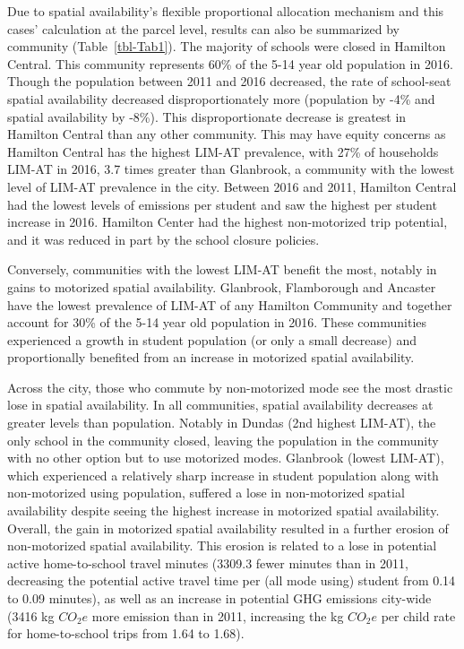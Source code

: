 \documentclass[
default
]{sn-jnl}
\begin{document}
Due to spatial availability's flexible proportional allocation mechanism
and this cases' calculation at the parcel level, results can also be
summarized by community (Table~\ref{tbl-Tab1}). The majority of schools
were closed in Hamilton Central. This community represents 60\% of the
5-14 year old population in 2016. Though the population between 2011 and
2016 decreased, the rate of school-seat spatial availability decreased
disproportionately more (population by -4\% and spatial availability by
-8\%). This disproportionate decrease is greatest in Hamilton Central
than any other community. This may have equity concerns as Hamilton
Central has the highest LIM-AT prevalence, with 27\% of households
LIM-AT in 2016, 3.7 times greater than Glanbrook, a community with the
lowest level of LIM-AT prevalence in the city. Between 2016 and 2011,
Hamilton Central had the lowest levels of emissions per student and saw
the highest per student increase in 2016. Hamilton Center had the
highest non-motorized trip potential, and it was reduced in part by the
school closure policies.

Conversely, communities with the lowest LIM-AT benefit the most, notably
in gains to motorized spatial availability. Glanbrook, Flamborough and
Ancaster have the lowest prevalence of LIM-AT of any Hamilton Community
and together account for 30\% of the 5-14 year old population in 2016.
These communities experienced a growth in student population (or only a
small decrease) and proportionally benefited from an increase in
motorized spatial availability.

Across the city, those who commute by non-motorized mode see the most
drastic lose in spatial availability. In all communities, spatial
availability decreases at greater levels than population. Notably in
Dundas (2nd highest LIM-AT), the only school in the community closed,
leaving the population in the community with no other option but to use
motorized modes. Glanbrook (lowest LIM-AT), which experienced a
relatively sharp increase in student population along with non-motorized
using population, suffered a lose in non-motorized spatial availability
despite seeing the highest increase in motorized spatial availability.
Overall, the gain in motorized spatial availability resulted in a
further erosion of non-motorized spatial availability. This erosion is
related to a lose in potential active home-to-school travel minutes
(3309.3 fewer minutes than in 2011, decreasing the potential active
travel time per (all mode using) student from 0.14 to 0.09 minutes), as
well as an increase in potential GHG emissions city-wide (3416 kg
\(CO_2e\) more emission than in 2011, increasing the kg \(CO_2e\) per
child rate for home-to-school trips from 1.64 to 1.68).
\end{document}
